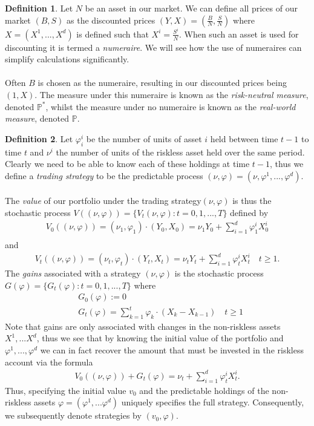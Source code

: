 \documentclass{article}
\theoremstyle{definition}
\newtheorem{definition}{Definition}[section]
\begin{document}
\begin{definition}
    Let $N$ be an asset in our market. We can define all prices of our market $(B,S)$ as the discounted prices $(Y, X) = (\frac{B}{N}, \frac{S}{N})$ where $X = (X^1,...,X^d)$ is defined such that $X^i = \frac{S^i}{N}$. When such an asset is used for discounting it is termed a \textit{numeraire}. We will see how the use of numeraires can simplify calculations significantly.\\\\
    Often $B$ is chosen as the numeraire, resulting in our discounted prices being $(1,X)$. The measure under this numeraire is known as the \textit{risk-neutral measure}, denoted $\mathbb{P}^*$, whilst the measure under no numeraire is known as the \textit{real-world measure}, denoted $\mathbb{P}$.
\end{definition}

\begin{definition}
    Let $\varphi^i_i$ be the number of units of asset $i$ held between time $t-1$ to time $t$ and $\nu^i$ the number of units of the riskless asset held over the same period. Clearly we need to be able to know each of these holdings at time $t-1$, thus we define a \textit{trading strategy} to be the predictable process $(\nu, \varphi) = (\nu, \varphi^1,...,\varphi^d)$.\\\\
    The \textit{value} of our portfolio under the trading strategy$( \nu, \varphi)$ is thus the stochastic process $V((\nu, \varphi))=\{V_t(\nu,\varphi): t = 0,1,...,T\}$ defined by
    \begin{align*}
        V_0((\nu, \varphi)) = (\nu_1, \varphi_1)\cdot(Y_0,X_0) = \nu_1 Y_0 + \sum_{i=1}^d\varphi_1^iX_0^i\\
    \end{align*}
    and
    \begin{align*}
        V_t((\nu, \varphi)) = (\nu_t, \varphi_t)\cdot(Y_t,X_t) = \nu_t Y_t + \sum_{i=1}^d\varphi_t^iX_t^i \quad t\geq 1.
    \end{align*}
    The \textit{gains} associated with a strategy $(\nu, \varphi)$ is the stochastic process $G(\varphi) = \{G_t(\varphi): t = 0,1,...,T \}$ where 
    \begin{align*}
        &G_0(\varphi) := 0\\
        &G_t(\varphi) = \sum_{k=1}^{t}\varphi_k \cdot (X_{k}-X_{k-1}) \quad t \geq 1
    \end{align*}
    Note that gains are only associated with changes in the non-riskless assets $X^1,...X^d$, thus we see that by knowing the initial value of the portfolio and $\varphi^1, ..., \varphi^d$ we can in fact recover the amount that must be invested in the riskless account via the formula
    \begin{align*}
        V_0((\nu, \varphi)) + G_t(\varphi) = \nu_t + \sum_{i=1}^d \varphi_t^i X_t^i.
    \end{align*}
    Thus, specifying the initial value $v_0$ and the predictable holdings of the non-riskless assets $\varphi = (\varphi^1,...\varphi^d)$ uniquely specifies the full strategy. Consequently, we subsequently denote strategies by $(v_0, \varphi)$.
\end{definition}
\end{document}
